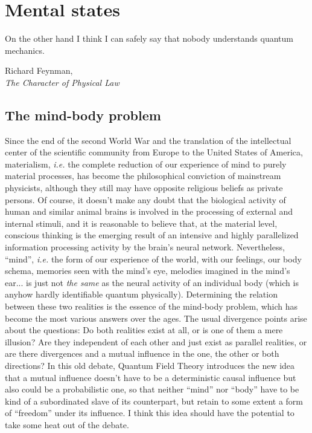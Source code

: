 \chapter{Mental states}
\label{Mental states}

\renewcommand{\epigraphwidth}{7cm}
\epigraph{On the other hand I think I can safely say that nobody understands quantum mechanics.}{Richard Feynman,\\\textit{The Character of Physical Law}~\cite{Feynman1964}}

\section{The mind-body problem}

Since the end of the second World War and the translation of the intellectual center of the scientific community from Europe to the United States of America, materialism, \textit{i.e.} the complete reduction of our experience of mind to purely material processes, has become the philosophical conviction of mainstream physicists, although they still may have opposite religious beliefs as private persons.
Of course, it doesn't make any doubt that the biological activity of human and similar animal brains is involved in the processing of external and internal stimuli, and it is reasonable to believe that, at the material level, conscious thinking is the emerging result of an intensive and highly parallelized information processing activity by the brain's neural network.
Nevertheless, ``mind'', \textit{i.e.} the form of our experience of the world, with our feelings, our body schema, memories seen with the mind's eye, melodies imagined in the mind's ear... is just not \textit{the same} as the neural activity of an individual body (which is anyhow hardly identifiable quantum physically).
Determining the relation between these two realities is the essence of the mind-body problem, which has become the most various answers over the ages.
The usual divergence points arise about the questions: Do both realities exist at all, or is one of them a mere illusion? Are they independent of each other and just exist as parallel realities, or are there divergences and a mutual influence in the one, the other or both directions? In this old debate, Quantum Field Theory introduces the new idea that a mutual influence doesn't have to be a deterministic causal influence but also could be a probabilistic one, so that neither ``mind'' nor ``body'' have to be kind of a subordinated slave of its counterpart, but retain to some extent a form of ``freedom'' under its influence.
I think this idea should have the potential to take some heat out of the debate.

